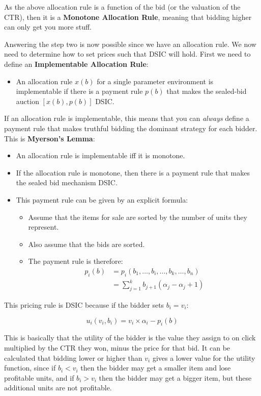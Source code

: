As the above allocation rule is a function of the bid (or the valuation of the
CTR), then it is a \textbf{Monotone Allocation Rule}, meaning that bidding
higher can only get you more stuff.

Answering the step two is now possible since we have an allocation rule. We now
need to determine how to set prices such that DSIC will hold. First we need to
define an \textbf{Implementable Allocation Rule}:

\begin{itemize}
  \item[] An allocation rule $x(b)$ for a single parameter environment is 
  implementable if there is a payment rule $p(b)$ that makes the sealed-bid 
  auction $[x(b), p(b)]$ DSIC.
\end{itemize}

If an allocation rule is implementable, this means that you can \textit{always}
define a payment rule that makes truthful bidding the dominant strategy for each
bidder. This is \textbf{Myerson's Lemma}:

\begin{itemize}
  \item An allocation rule is implementable iff it is monotone.
  \item If the allocation rule is monotone, then there is a payment rule that
  makes the sealed bid mechanism DSIC.
  \item This payment rule can be given by an explicit formula:
  \begin{itemize}
    \item Assume that the items for sale are sorted by the number of units they
    represent.
    \item Also assume that the bids are sorted.
    \item The payment rule is therefore:
    \[
      \begin{split}
        p_i(b) &= p_i(b_1, \dots, b_i, \dots, b_k, \dots, b_n)\\
               &= \sum^k_{j=1}b_{j+1}(\alpha_j - \alpha_j+1)
      \end{split}
    \]
  \end{itemize}
\end{itemize}

This pricing rule is DSIC because if the bidder sets $b_i = v_i$:

\[
  u_i(v_i, b_i) = v_i \times \alpha_i - p_i(b)
\]

This is basically that the utility of the bidder is the value they assign to on
click multiplied by the CTR they won, minus the price for that bid. It can be
calculated that bidding lower or higher than $v_i$ gives a lower value for the
utility function, since if $b_i < v_i$ then the bidder may get a smaller item
and lose profitable units, and if $b_i > v_i$ then the bidder may get a bigger
item, but these additional units are not profitable.
